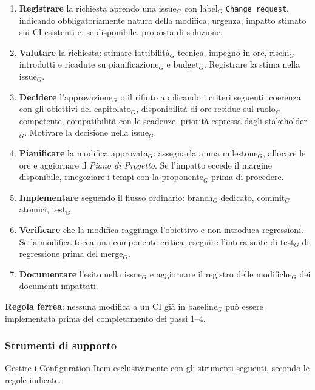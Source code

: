 \documentclass[a4paper, 10pt]{article}
\begin{document}
\begin{enumerate}
    \item \textbf{Registrare} la richiesta aprendo una issue$_G$ con label$_G$ \texttt{Change request}, indicando obbligatoriamente natura della modifica, urgenza, impatto stimato sui CI esistenti e, se disponibile, proposta di soluzione.
    \item \textbf{Valutare} la richiesta: stimare fattibilità$_G$ tecnica, impegno in ore, rischi$_G$ introdotti e ricadute su pianificazione$_G$ e budget$_G$. Registrare la stima nella issue$_G$.
    \item \textbf{Decidere} l'approvazione$_G$ o il rifiuto applicando i criteri seguenti: coerenza con gli obiettivi del capitolato$_G$, disponibilità di ore residue sul ruolo$_G$ competente, compatibilità con le scadenze, priorità espressa dagli stakeholder$_G$. Motivare la decisione nella issue$_G$.
    \item \textbf{Pianificare} la modifica approvata$_G$: assegnarla a una milestone$_G$, allocare le ore e aggiornare il \emph{Piano di Progetto}. Se l'impatto eccede il margine disponibile, rinegoziare i tempi con la proponente$_G$ prima di procedere.
    \item \textbf{Implementare} seguendo il flusso ordinario: branch$_G$ dedicato, commit$_G$ atomici, test$_G$.
    \item \textbf{Verificare} che la modifica raggiunga l'obiettivo e non introduca regressioni. Se la modifica tocca una componente critica, eseguire l'intera suite di test$_G$ di regressione prima del merge$_G$.
    \item \textbf{Documentare} l'esito nella issue$_G$ e aggiornare il registro delle modifiche$_G$ dei documenti impattati.
\end{enumerate}

\noindent \textbf{Regola ferrea}: nessuna modifica a un CI già in baseline$_G$ può essere implementata prima del completamento dei passi 1--4.

\subsubsection{Strumenti di supporto}
\label{subsubsec:strumenti_configurazione}

Gestire i Configuration Item esclusivamente con gli strumenti seguenti, secondo le regole indicate.
\end{document}
